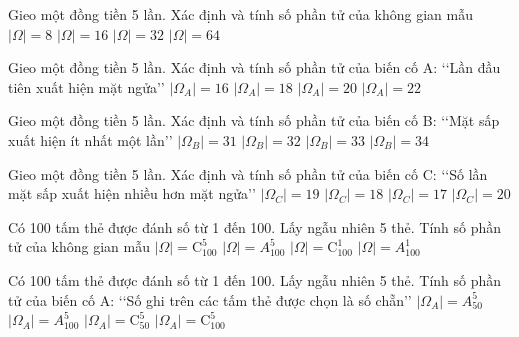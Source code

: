 \begin{ex}
Gieo một đồng tiền 5 lần. Xác định và tính số phần tử của không gian mẫu
\choice
{$|\Omega|=8$}
{$|\Omega|=16$}
{\True $|\Omega|=32$}
{$|\Omega|=64$}
\end{ex}
\begin{ex}
Gieo một đồng tiền 5 lần. Xác định và tính số phần tử của biến cố A: \lq\lq  Lần đầu tiên xuất hiện mặt ngửa\rq\rq 
\choice
{\True $|\Omega_A|=16$}
{$|\Omega_A|=18$}
{$|\Omega_A|=20$}
{$|\Omega_A|=22$}
\end{ex}
\begin{ex}
Gieo một đồng tiền 5 lần. Xác định và tính số phần tử của biến cố B: \lq\lq  Mặt sấp xuất hiện ít nhất một lần\rq\rq 
\choice
{\True $|\Omega_B|=31$}
{$|\Omega_B|=32$}
{$|\Omega_B|=33$}
{$|\Omega_B|=34$}
\end{ex}
\begin{ex}
Gieo một đồng tiền 5 lần. Xác định và tính số phần tử của biến cố C: \lq\lq  Số lần mặt sấp xuất hiện nhiều hơn mặt ngửa\rq\rq 
\choice
{$|\Omega_C|=19$}
{$|\Omega_C|=18$}
{\True $|\Omega_C|=17$}
{$|\Omega_C|=20$}
\end{ex}
\begin{ex}
Có 100 tấm thẻ được đánh số từ 1 đến 100. Lấy ngẫu nhiên 5 thẻ. Tính số phần tử của không gian mẫu
\choice
{\True $|\Omega|=\mathrm{C}_{100}^5$}
{$|\Omega|=A_{100}^5$}
{$|\Omega|=\mathrm{C}_{100}^1$}
{$|\Omega|=A_{100}^1$}
\end{ex}
\begin{ex}
Có 100 tấm thẻ được đánh số từ 1 đến 100. Lấy ngẫu nhiên 5 thẻ. Tính số phần tử của biến cố A: \lq\lq  Số ghi trên các tấm thẻ được chọn là số chẵn\rq\rq 
\choice
{$|\Omega_A|=A_{50}^5$}
{$|\Omega_A|=A_{100}^5$}
{\True $|\Omega_A|=\mathrm{C}_{50}^5$}
{$|\Omega_A|=\mathrm{C}_{100}^5$}
\end{ex}
